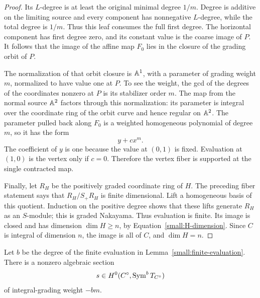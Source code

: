 \begin{proof}
Its \(L\)-degree is at least the original minimal degree \(1/m\).
Degree is additive on the limiting source and every component has
nonnegative \(L\)-degree, while the total degree is \(1/m\).
Thus this leaf consumes the full first degree.  The horizontal
component has first degree zero, and its constant value is the
coarse image of \(P\).  It follows that the image of the affine map
\(F_0\) lies in the closure of the grading orbit of \(P\).

The normalization of that orbit closure is \(\mathbb A^1\), with a
parameter of grading weight \(m\), normalized to have value one at
\(P\).  To see the weight, the gcd of the degrees of the coordinates
nonzero at \(P\) is its stabilizer order \(m\).  The map from the
normal source \(\mathbb A^2\) factors through this normalization: its
parameter is integral over the coordinate ring of the orbit curve
and hence regular on \(\mathbb A^2\).  The parameter pulled back along
\(F_0\) is a weighted homogeneous polynomial of degree \(m\), so it
has the form
\[
 y+c x^m.
\]
The coefficient of \(y\) is one because the value at \((0,1)\) is
fixed.  Evaluation at \((1,0)\) is the vertex only if \(c=0\).
Therefore the vertex fiber is supported at the single contracted map.

Finally, let \(R_H\) be the positively graded coordinate ring of
\(H\).  The preceding fiber statement says that
\(R_H/S_+R_H\) is finite dimensional.  Lift a homogeneous basis of
this quotient.  Induction on the positive degree shows that these
lifts generate \(R_H\) as an \(S\)-module; this is graded
Nakayama.  Thus evaluation is finite.  Its image is closed and has
dimension \(\dim H\geq n\), by Equation~\eqref{small:H-dimension}.
Since \(C\) is integral of dimension \(n\), the image is all of
\(C\), and \(\dim H=n\).
\end{proof}

\begin{lemma}
\label{small:norm-tensor}
Let \(b\) be the degree of the finite evaluation in
Lemma~\ref{small:finite-evaluation}.  There is a nonzero algebraic
section
\[
 s\in H^0(C^\circ,\operatorname{Sym}^bT_{C^\circ})
\]
of integral-grading weight \(-bm\).
\end{lemma}

